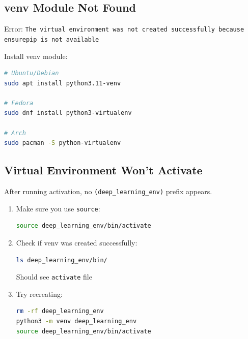 \documentclass[11pt,a4paper]{article}
\begin{document}
\subsection{venv Module Not Found}

\begin{problembox}
Error: \texttt{The virtual environment was not created successfully because ensurepip is not available}
\end{problembox}

\begin{solutionbox}
Install venv module:
\begin{lstlisting}[language=bash]
# Ubuntu/Debian
sudo apt install python3.11-venv

# Fedora
sudo dnf install python3-virtualenv

# Arch
sudo pacman -S python-virtualenv
\end{lstlisting}
\end{solutionbox}

\subsection{Virtual Environment Won't Activate}

\begin{problembox}
After running activation, no \texttt{(deep\_learning\_env)} prefix appears.
\end{problembox}

\begin{solutionbox}
\begin{enumerate}
    \item Make sure you use \texttt{source}:
    \begin{lstlisting}[language=bash]
source deep_learning_env/bin/activate
    \end{lstlisting}
    
    \item Check if venv was created successfully:
    \begin{lstlisting}[language=bash]
ls deep_learning_env/bin/
    \end{lstlisting}
    Should see \texttt{activate} file
    
    \item Try recreating:
    \begin{lstlisting}[language=bash]
rm -rf deep_learning_env
python3 -m venv deep_learning_env
source deep_learning_env/bin/activate
    \end{lstlisting}
\end{enumerate}
\end{solutionbox}
\end{document}
